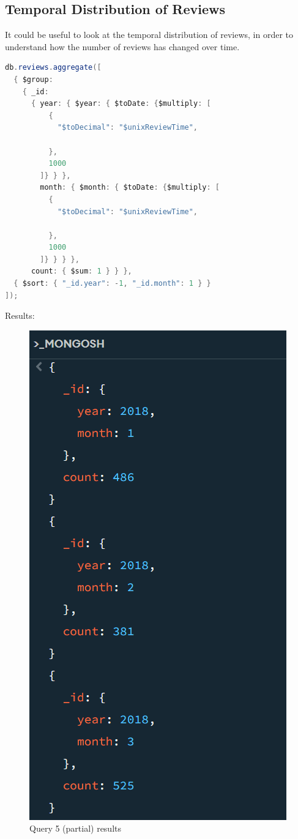 \subsection{Temporal Distribution of Reviews}
It could be useful to look at the temporal distribution of reviews, in order to understand how the number of reviews has changed over time. \\
\begin{lstlisting}[language=Java]
db.reviews.aggregate([
  { $group: 
    { _id: 
      { year: { $year: { $toDate: {$multiply: [
          {
            "$toDecimal": "$unixReviewTime",
            
          },
          1000
        ]} } }, 
        month: { $month: { $toDate: {$multiply: [
          {
            "$toDecimal": "$unixReviewTime",
            
          },
          1000
        ]} } } }, 
      count: { $sum: 1 } } },
  { $sort: { "_id.year": -1, "_id.month": 1 } }
]);
\end{lstlisting}
Results:
\begin{figure}[H]
  \centering
  \includegraphics[scale=0.45]{Images/q5_result.png}
  \caption{Query 5 (partial) results}
  \label{fig:q5_result}
\end{figure}
